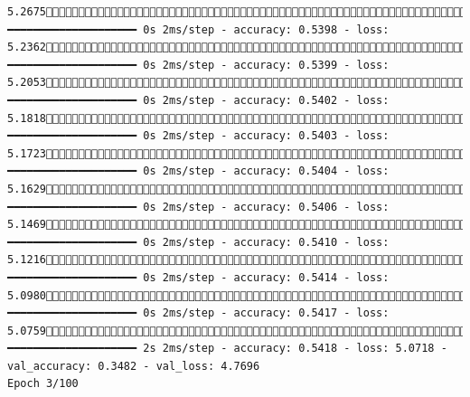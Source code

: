\documentclass[
  letterpaper,
  DIV=11,
  numbers=noendperiod]{scrartcl}
\begin{document}
\begin{verbatim}
5.2675643/858 ━━━━━━━━━━━━━━━━━━━━ 0s 2ms/step - accuracy: 0.5398 - loss: 5.2362680/858 ━━━━━━━━━━━━━━━━━━━━ 0s 2ms/step - accuracy: 0.5399 - loss: 5.2053709/858 ━━━━━━━━━━━━━━━━━━━━ 0s 2ms/step - accuracy: 0.5402 - loss: 5.1818721/858 ━━━━━━━━━━━━━━━━━━━━ 0s 2ms/step - accuracy: 0.5403 - loss: 5.1723733/858 ━━━━━━━━━━━━━━━━━━━━ 0s 2ms/step - accuracy: 0.5404 - loss: 5.1629754/858 ━━━━━━━━━━━━━━━━━━━━ 0s 2ms/step - accuracy: 0.5406 - loss: 5.1469788/858 ━━━━━━━━━━━━━━━━━━━━ 0s 2ms/step - accuracy: 0.5410 - loss: 5.1216821/858 ━━━━━━━━━━━━━━━━━━━━ 0s 2ms/step - accuracy: 0.5414 - loss: 5.0980853/858 ━━━━━━━━━━━━━━━━━━━━ 0s 2ms/step - accuracy: 0.5417 - loss: 5.0759858/858 ━━━━━━━━━━━━━━━━━━━━ 2s 2ms/step - accuracy: 0.5418 - loss: 5.0718 - val_accuracy: 0.3482 - val_loss: 4.7696
Epoch 3/100

\end{verbatim}
\end{document}
